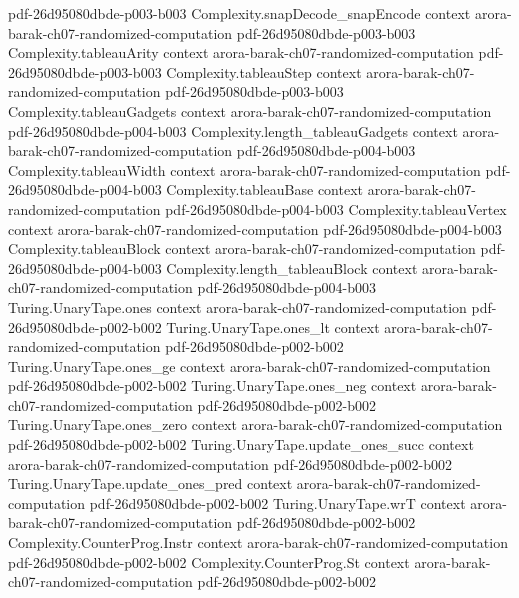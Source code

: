 \begin{theorem}
  {pdf-26d95080dbde-p003-b003}
\proofstep
  {Complexity.snapDecode_snapEncode}
  {context}
  {arora-barak-ch07-randomized-computation}
  {pdf-26d95080dbde-p003-b003}
\proofstep
  {Complexity.tableauArity}
  {context}
  {arora-barak-ch07-randomized-computation}
  {pdf-26d95080dbde-p003-b003}
\proofstep
  {Complexity.tableauStep}
  {context}
  {arora-barak-ch07-randomized-computation}
  {pdf-26d95080dbde-p003-b003}
\proofstep
  {Complexity.tableauGadgets}
  {context}
  {arora-barak-ch07-randomized-computation}
  {pdf-26d95080dbde-p004-b003}
\proofstep
  {Complexity.length_tableauGadgets}
  {context}
  {arora-barak-ch07-randomized-computation}
  {pdf-26d95080dbde-p004-b003}
\proofstep
  {Complexity.tableauWidth}
  {context}
  {arora-barak-ch07-randomized-computation}
  {pdf-26d95080dbde-p004-b003}
\proofstep
  {Complexity.tableauBase}
  {context}
  {arora-barak-ch07-randomized-computation}
  {pdf-26d95080dbde-p004-b003}
\proofstep
  {Complexity.tableauVertex}
  {context}
  {arora-barak-ch07-randomized-computation}
  {pdf-26d95080dbde-p004-b003}
\proofstep
  {Complexity.tableauBlock}
  {context}
  {arora-barak-ch07-randomized-computation}
  {pdf-26d95080dbde-p004-b003}
\proofstep
  {Complexity.length_tableauBlock}
  {context}
  {arora-barak-ch07-randomized-computation}
  {pdf-26d95080dbde-p004-b003}
\proofstep
  {Turing.UnaryTape.ones}
  {context}
  {arora-barak-ch07-randomized-computation}
  {pdf-26d95080dbde-p002-b002}
\proofstep
  {Turing.UnaryTape.ones_lt}
  {context}
  {arora-barak-ch07-randomized-computation}
  {pdf-26d95080dbde-p002-b002}
\proofstep
  {Turing.UnaryTape.ones_ge}
  {context}
  {arora-barak-ch07-randomized-computation}
  {pdf-26d95080dbde-p002-b002}
\proofstep
  {Turing.UnaryTape.ones_neg}
  {context}
  {arora-barak-ch07-randomized-computation}
  {pdf-26d95080dbde-p002-b002}
\proofstep
  {Turing.UnaryTape.ones_zero}
  {context}
  {arora-barak-ch07-randomized-computation}
  {pdf-26d95080dbde-p002-b002}
\proofstep
  {Turing.UnaryTape.update_ones_succ}
  {context}
  {arora-barak-ch07-randomized-computation}
  {pdf-26d95080dbde-p002-b002}
\proofstep
  {Turing.UnaryTape.update_ones_pred}
  {context}
  {arora-barak-ch07-randomized-computation}
  {pdf-26d95080dbde-p002-b002}
\proofstep
  {Turing.UnaryTape.wrT}
  {context}
  {arora-barak-ch07-randomized-computation}
  {pdf-26d95080dbde-p002-b002}
\proofstep
  {Complexity.CounterProg.Instr}
  {context}
  {arora-barak-ch07-randomized-computation}
  {pdf-26d95080dbde-p002-b002}
\proofstep
  {Complexity.CounterProg.St}
  {context}
  {arora-barak-ch07-randomized-computation}
  {pdf-26d95080dbde-p002-b002}

\end{theorem}
